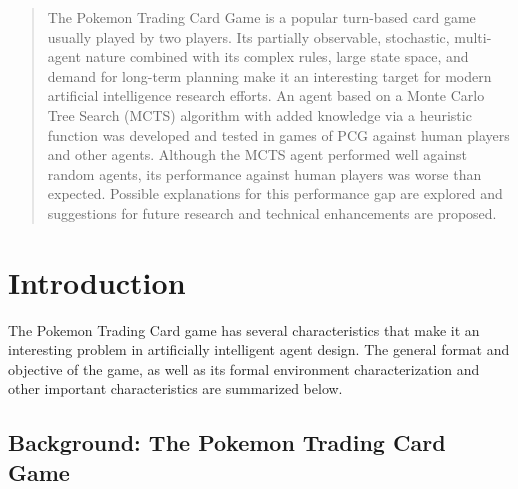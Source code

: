 \documentclass{article}
\begin{document}
 

\begin{abstract} %

The Pokemon Trading Card Game is a popular turn-based card game usually played by two players. Its partially observable, stochastic, multi-agent nature combined with its complex rules, large state space, and demand for long-term planning make it an interesting target for modern artificial intelligence research efforts. An agent based on a Monte Carlo Tree Search (MCTS) algorithm with added knowledge via a heuristic function was developed and tested in games of PCG against human players and other agents. Although the MCTS agent performed well against random agents, its performance against human players was  worse than expected. Possible explanations for this performance gap are explored and suggestions for future research and technical enhancements are proposed.

\end{abstract} 

\section{Introduction} %
The Pokemon Trading Card game has several characteristics that make it an interesting problem in artificially intelligent agent design. The general format and objective of the game, as well as its formal environment characterization and other important characteristics are summarized below.

\subsection{Background: The Pokemon Trading Card Game} %
\end{document}
